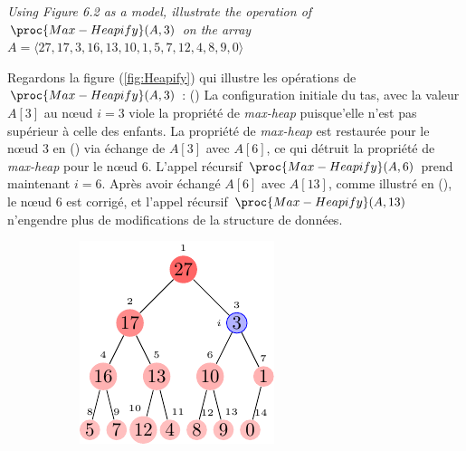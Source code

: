 \begin{description}
   \textit{Using Figure 6.2 as a model, illustrate the operation of $\proc{Max-Heapify}(A,3)$ on the array $A = \langle 27, 17, 3, 16, 13, 10, 1, 5, 7, 12, 4, 8, 9, 0 \rangle$}
    \begin{ex}

      Regardons la figure (\ref{fig:Heapify}) qui illustre les op\'erations de $\proc{Max-Heapify}(A,3)$ : () La configuration initiale du tas, avec la valeur $A[3]$ au n\oe ud $i = 3$ viole la propri\'et\'e de \textit{max-heap} puisque'elle n'est pas sup\'erieur \`a celle des enfants. La propri\'et\'e de \textit{max-heap} est restaur\'ee pour le n\oe ud $3$ en () via \'echange de $A[3]$ avec $A[6]$, ce qui d\'etruit la propri\'et\'e de \textit{max-heap} pour le n\oe ud $6$. L'appel r\'ecursif $\proc{Max-Heapify}(A,6)$ prend maintenant $i=6$. Apr\`es  avoir \'echang\'e $A[6]$ avec $A[13]$, comme illustr\'e en (), le n\oe ud $6$ est corrig\'e, et l'appel r\'ecursif $\proc{Max-Heapify}(A,13)$ n'engendre plus de modifications de la structure de donn\'ees.

      \begin{figure}[t]
        \centering
        \begin{subfigure}[t]{.45\textwidth}
          \centering
          \includegraphics[scale=1.4]{img/6_2-1/6_2-1_1}
          \caption{}\label{fig:6_2-1_1}
        \end{subfigure}


\end{figure}
\end{ex}
\end{description}
